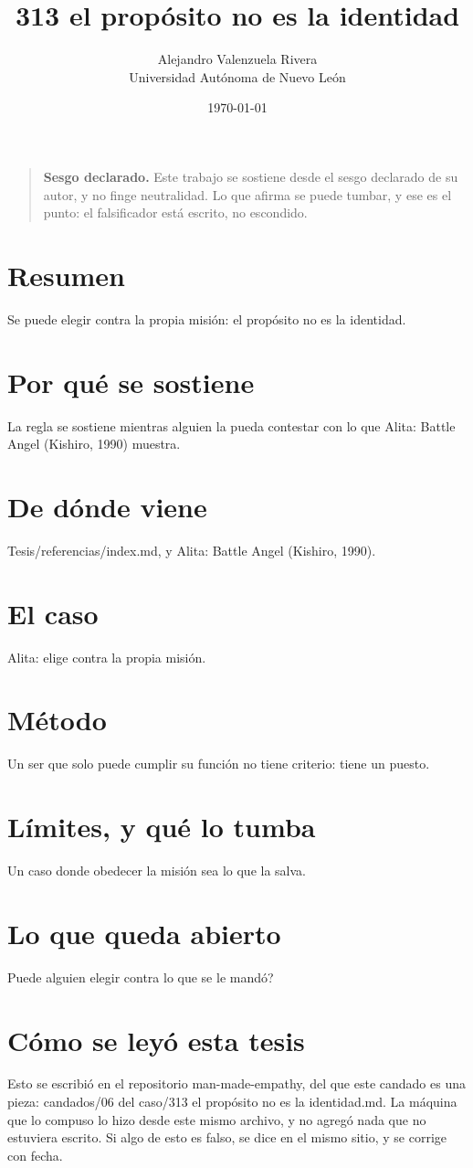 \documentclass[11pt,a4paper]{article}
\title{313 el propósito no es la identidad}
\author{Alejandro Valenzuela Rivera\\\small Universidad Autónoma de Nuevo León}
\date{\today}
\begin{document}
\maketitle

\begin{quote}
\textbf{Sesgo declarado.} Este trabajo se sostiene desde el sesgo declarado de su autor, y no finge neutralidad. Lo que afirma se puede tumbar, y ese es el punto: el falsificador está escrito, no escondido.
\end{quote}

\section*{Resumen}
Se puede elegir contra la propia misión: el propósito no es la identidad.

\section{Por qué se sostiene}
La regla se sostiene mientras alguien la pueda contestar con lo que Alita: Battle Angel (Kishiro, 1990) muestra.

\section{De dónde viene}
Tesis/referencias/index.md, y Alita: Battle Angel (Kishiro, 1990).

\section{El caso}
Alita: elige contra la propia misión.

\section{Método}
Un ser que solo puede cumplir su función no tiene criterio: tiene un puesto.

\section{Límites, y qué lo tumba}
Un caso donde obedecer la misión sea lo que la salva.

\section{Lo que queda abierto}
\textquestiondown{}Puede alguien elegir contra lo que se le mandó?

\section*{Cómo se leyó esta tesis}
Esto se escribió en el repositorio man-made-empathy, del que este candado es una pieza: candados/06 del caso/313 el propósito no es la identidad.md. La máquina que lo compuso lo hizo desde este mismo archivo, y no agregó nada que no estuviera escrito. Si algo de esto es falso, se dice en el mismo sitio, y se corrige con fecha.
\end{document}
